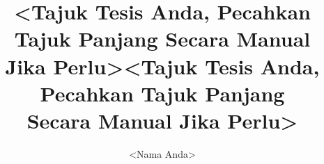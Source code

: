 \documentclass[bahasam,nohyphen]{../../packages/GayaUKM}
\title{<Tajuk Tesis Anda, Pecahkan Tajuk Panjang Secara Manual\protect\\Jika Perlu>}
\author{<Nama Anda>}
\begin{document}
\makecoverpage

\title{<Tajuk Tesis Anda, Pecahkan Tajuk Panjang\protect\\Secara Manual Jika Perlu>}
\maketitlepage

\frontmatter
\declaration








\tableofcontents\clearpage
\listoffigures\clearpage
\listoftables\clearpage




\mainmatter







\appendix


\end{document}
